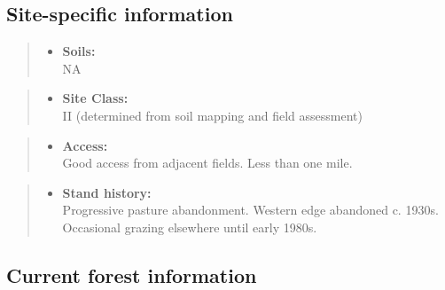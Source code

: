 \documentclass[]{tufte-handout}
\providecommand{\tightlist}{%
  \setlength{\itemsep}{0pt}\setlength{\parskip}{0pt}}
\begin{document}
\subsection{Site-specific
information}\label{site-specific-information-3}

\begin{quote}
\begin{itemize}
\tightlist
\item
  \textbf{Soils:}\\
  \indent\indent  NA
\end{itemize}
\end{quote}

\begin{quote}
\begin{itemize}
\tightlist
\item
  \textbf{Site Class:}\\
  \vspace{2pt} II (determined from soil mapping and field assessment)
\end{itemize}
\end{quote}

\begin{quote}
\begin{itemize}
\tightlist
\item
  \textbf{Access:}\\
  \vspace{2pt} Good access from adjacent fields. Less than one mile.
\end{itemize}
\end{quote}

\begin{quote}
\begin{itemize}
\tightlist
\item
  \textbf{Stand history:}\\
  \vspace{2pt} Progressive pasture abandonment. Western edge abandoned
  c. 1930s. Occasional grazing elsewhere until early 1980s.
\end{itemize}
\end{quote}

\subsection{Current forest
information}\label{current-forest-information-3}
\end{document}
